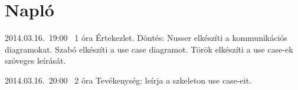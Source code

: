 %
\section{Napló}

\begin{naplo}

\bejegyzes
{2014.03.16.~19:00~}
{1 óra}
{\vadam\newline
\vantal\newline
\vbator\newline
\vtorok}
{Értekezlet. Döntés: Nusser elkészíti a kommunikációs diagramokat. Szabó elkészíti a use case diagramot. Török elkészíti a use case-ek szöveges leírását.}

\bejegyzes
{2014.03.16.~20:00~}
{2 óra}
{\vtorok}
{Tevékenység: \vtorok leírja a szkeleton use case-eit.}



\end{naplo}

